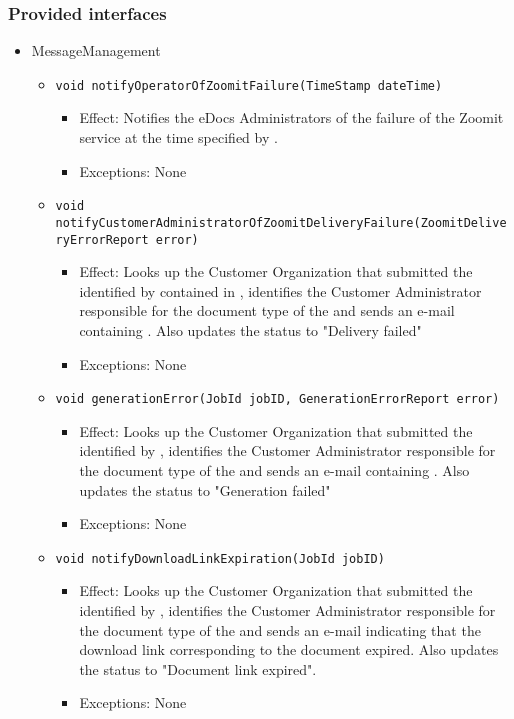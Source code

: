 \subsubsection*{Provided interfaces}
\begin{itemize}
    \item MessageManagement
    \begin{itemize}
        \item \texttt{void notifyOperatorOfZoomitFailure(TimeStamp dateTime)}
        \begin{itemize}
            \item Effect: Notifies the eDocs Administrators of the failure of the Zoomit service at the time specified by .
            \item Exceptions: None
        \end{itemize}
		
		\item \texttt{void notifyCustomerAdministratorOfZoomitDeliveryFailure(ZoomitDeliveryErrorReport error)}
        \begin{itemize}
            \item Effect: Looks up the Customer Organization that submitted the  identified by  contained in , identifies the Customer Administrator responsible for the document type of the  and sends an e-mail containing . Also updates the status to "Delivery failed"
            \item Exceptions: None
        \end{itemize}

        \item \texttt{void generationError(JobId jobID, GenerationErrorReport error)}
		    \begin{itemize}
                \item Effect: Looks up the Customer Organization that submitted the  identified by , identifies the Customer Administrator responsible for the document type of the  and sends an e-mail containing . Also updates the status to "Generation failed"
                \item Exceptions: None
            \end{itemize}

		\item \texttt{void notifyDownloadLinkExpiration(JobId jobID)}
		    \begin{itemize}
                \item Effect: Looks up the Customer Organization that submitted the  identified by , identifies the Customer Administrator responsible for the document type of the  and sends an e-mail indicating that the download link corresponding to the document expired. Also updates the status to "Document link expired".
                \item Exceptions: None
            \end{itemize}


\end{itemize}
\end{itemize}

